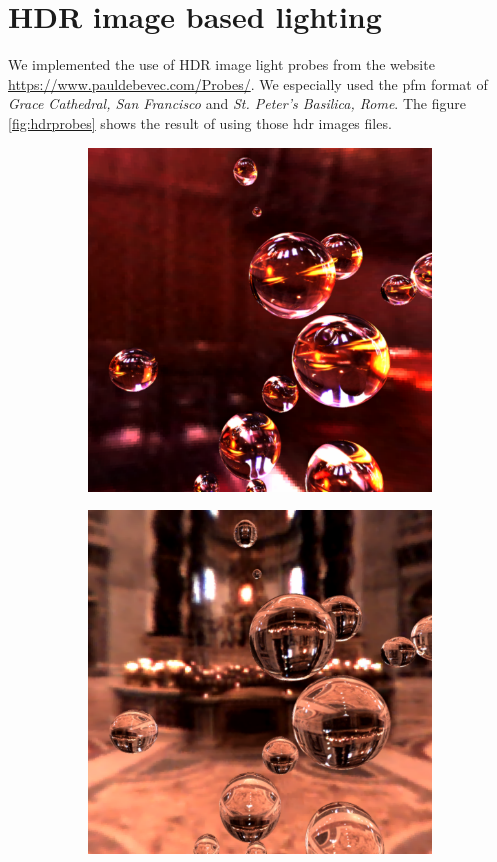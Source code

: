 \documentclass[acmsmall]{acmart}
\begin{document}
\section{HDR image based lighting}
We implemented the use of HDR image light probes from the website \url{https://www.pauldebevec.com/Probes/}.
We especially used the pfm format of \textit{Grace Cathedral, San Francisco} and \textit{St. Peter's Basilica, Rome}.
The figure \ref{fig:hdrprobes} shows the result of using those hdr images files.
\begin{figure}[h]
    \centering
    
\begin{subfigure}{.5\textwidth}
  \centering
  \includegraphics[width=.9\linewidth]{img/grace.png}
\end{subfigure}%
\begin{subfigure}{.5\textwidth}
  \centering
  \includegraphics[width=.9\linewidth]{img/stpeters.png}
\end{subfigure}    
    

\end{figure}
\end{document}
